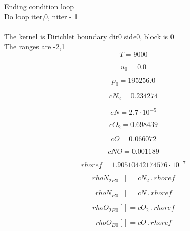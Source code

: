\documentclass{article}
\begin{document}
\noindent Ending condition loop %
\\\noindent Do loop iter,0, niter - 1\\
\\\noindent The kernel is Dirichlet boundary dir0 side0, block is 0\\\noindent The ranges are -2,1\\\begin{dmath}T = 9000\end{dmath}

\begin{dmath}u_{0} = 0.0\end{dmath}

\begin{dmath}p_{0} = 195256.0\end{dmath}

\begin{dmath}cN_{2} = 0.234274\end{dmath}

\begin{dmath}cN = 2.7 \cdot 10^{-5}\end{dmath}

\begin{dmath}cO_{2} = 0.698439\end{dmath}

\begin{dmath}cO = 0.066072\end{dmath}

\begin{dmath}cNO = 0.001189\end{dmath}

\begin{dmath}rhoref = 1.90510442174576 \cdot 10^{-7}\end{dmath}

\begin{dmath}{rhoN_{2}{_{B0}}}[{}] = cN_{2} \,.\, rhoref\end{dmath}

\begin{dmath}{rhoN{_{B0}}}[{}] = cN \,.\, rhoref\end{dmath}

\begin{dmath}{rhoO_{2}{_{B0}}}[{}] = cO_{2} \,.\, rhoref\end{dmath}

\begin{dmath}{rhoO{_{B0}}}[{}] = cO \,.\, rhoref\end{dmath}
\end{document}

